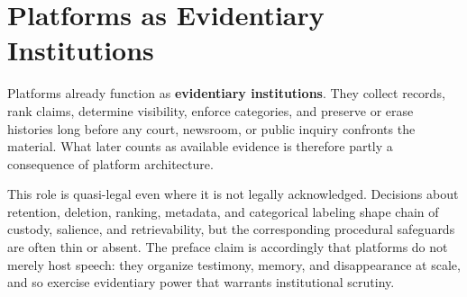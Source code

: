 
\chapter{Platforms as Evidentiary Institutions}
\label{ch:ch065}


Platforms already function as \textbf{evidentiary institutions}. They collect records, rank claims, determine visibility, enforce categories, and preserve or erase histories long before any court, newsroom, or public inquiry confronts the material. What later counts as available evidence is therefore partly a consequence of platform architecture.

This role is quasi-legal even where it is not legally acknowledged. Decisions about retention, deletion, ranking, metadata, and categorical labeling shape chain of custody, salience, and retrievability, but the corresponding procedural safeguards are often thin or absent. The preface claim is accordingly that platforms do not merely host speech: they organize testimony, memory, and disappearance at scale, and so exercise evidentiary power that warrants institutional scrutiny.
